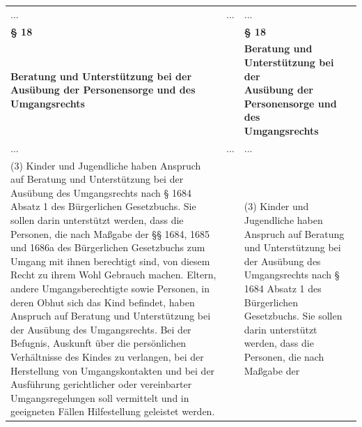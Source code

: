 \documentclass[10pt,a4paper,landscape]{article}
\begin{document}
\begin{longtable}{|L{8.2cm}|L{8.2cm}|L{8.2cm}|}
\hhline{|---|}
... & ... & ... \\
\hhline{|---|}
\textbf{\S{} 18} &  & \textbf{\S{} 18} \\
\hhline{|---|}
\textbf{Beratung und Unterstützung bei der  \newline Ausübung der Personensorge und des  \newline Umgangsrechts} &  & \textbf{Beratung und Unterstützung bei der  \newline Ausübung der Personensorge und des  \newline Umgangsrechts} \\
\hhline{|---|}
... & ... & ... \\
\hhline{|---|}
(3) Kinder und Jugendliche haben  \newline Anspruch auf Beratung und Unterstützung  \newline bei der Ausübung des Umgangsrechts  \newline nach \S{} 1684 Absatz 1 des Bürgerlichen  \newline Gesetzbuchs. Sie sollen darin unterstützt  \newline werden, dass die Personen, die nach  \newline Maßgabe der \S{}\S{} 1684, 1685 und 1686a  \newline des Bürgerlichen Gesetzbuchs zum  \newline Umgang mit ihnen berechtigt sind, von  \newline diesem Recht zu ihrem Wohl Gebrauch  \newline machen. Eltern, andere  \newline Umgangsberechtigte sowie Personen, in  \newline deren Obhut sich das Kind befindet, haben  \newline Anspruch auf Beratung und Unterstützung  \newline bei der Ausübung des Umgangsrechts. Bei  der Befugnis, Auskunft über die  \newline persönlichen Verhältnisse \textcolor{diffred}{des Kindes} zu  \newline verlangen, bei der Herstellung von  \newline Umgangskontakten und bei der Ausführung  \newline gerichtlicher oder vereinbarter  \newline Umgangsregelungen soll vermittelt und in  \newline geeigneten Fällen Hilfestellung geleistet  \newline \textcolor{diffred}{werden.} &  & (3) Kinder und Jugendliche haben  \newline Anspruch auf Beratung und Unterstützung  \newline bei der Ausübung des Umgangsrechts  \newline nach \S{} 1684 Absatz 1 des Bürgerlichen  \newline Gesetzbuchs. Sie sollen darin unterstützt  \newline werden, dass die Personen, die nach  \newline Maßgabe der 
\end{longtable}
\end{document}
